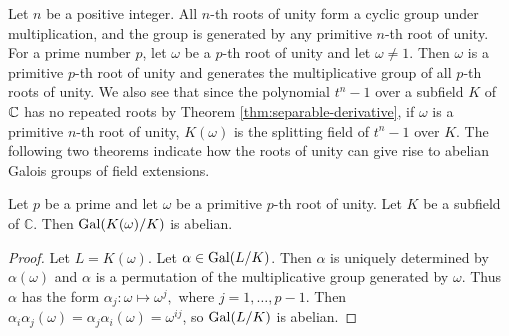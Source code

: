 Let $n$ be a positive integer. All $n$-th roots of unity form a cyclic group under multiplication, and the group is generated by any primitive $n$-th root of unity. For a prime number $p$, let $\omega$ be a $p$-th root of unity and let $\omega \neq 1$. Then $\omega$ is a primitive $p$-th root of unity and generates the multiplicative group of all $p$-th roots of unity. We also see that since the polynomial $t^n - 1$ over a subfield $K$ of $\mathbb C$ has no repeated roots by Theorem \ref{thm:separable-derivative}, if $\omega$ is a primitive $n$-th root of unity, $K(\omega)$ is the splitting field of $t^n - 1$ over $K$. The following two theorems indicate how the roots of unity can give rise to abelian Galois groups of field extensions. 



%




\begin{theorem} \label{thm:radical-1}
	Let $p$ be a prime and let $\omega$ be a primitive $p$-th root of unity. Let $K$ be a subfield of $\mathbb C$. Then $\operatorname{Gal}(K(\omega) / K)$ is abelian.
\end{theorem}
\begin{proof}
	Let $L = K(\omega)$.  Let $\alpha \in \operatorname{Gal}(L / K)$. Then $\alpha$ is uniquely determined by $\alpha(\omega)$ and $\alpha$ is a permutation of the multiplicative group generated by $\omega$. Thus $\alpha$ has the form
	$
	\alpha_j: \omega \mapsto \omega^j,
	$
	where $j=1,\dots,p-1$. Then $\alpha_i \alpha_j (\omega) = \alpha_j \alpha_i (\omega) = \omega^{i j}$, so $ \operatorname{Gal}(L / K)$ is abelian.	
\end{proof}

